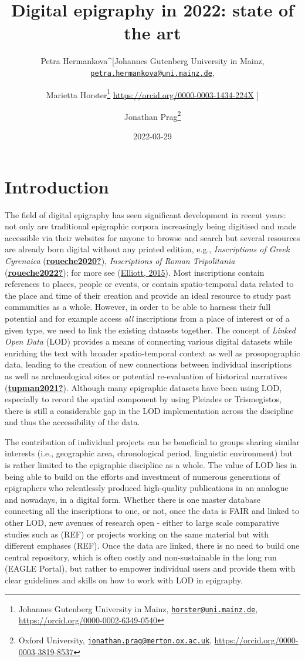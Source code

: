 \documentclass[
]{article}
\title{Digital epigraphy in 2022: state of the art}
\author{Petra Hermankova\^{}{[}Johannes Gutenberg University in Mainz,
\href{mailto:petra.hermankova@uni.mainz.de}{\nolinkurl{petra.hermankova@uni.mainz.de}}, \and Marietta
Horster\footnote{Johannes Gutenberg University in Mainz,
  \href{mailto:horster@uni.mainz.de}{\nolinkurl{horster@uni.mainz.de}},
  \url{https://orcid.org/0000-0002-6349-0540}}
\url{https://orcid.org/0000-0003-1434-224X} {]} \and Jonathan
Prag\footnote{Oxford University,
  \href{mailto:jonathan.prag@merton.ox.ac.uk}{\nolinkurl{jonathan.prag@merton.ox.ac.uk}},
  \url{https://orcid.org/0000-0003-3819-8537}}}
\date{2022-03-29}
\begin{document}
\maketitle

{
\setcounter{tocdepth}{4}
\tableofcontents
}
\hypertarget{introduction}{%
\section{Introduction}\label{introduction}}

The field of digital epigraphy has seen significant development in
recent years: not only are traditional epigraphic corpora increasingly
being digitised and made accessible via their websites for anyone to
browse and search but several resources are already born digital without
any printed edition, e.g., \emph{Inscriptions of Greek Cyrenaica}
(\protect\hyperlink{ref-roueche2020}{\textbf{roueche2020?}}),
\emph{Inscriptions of Roman Tripolitania}
(\protect\hyperlink{ref-roueche2022}{\textbf{roueche2022?}}); for more
see (\protect\hyperlink{ref-bruun_epigraphy_2015}{Elliott, 2015}). Most
inscriptions contain references to places, people or events, or contain
spatio-temporal data related to the place and time of their creation and
provide an ideal resource to study past communities as a whole. However,
in order to be able to harness their full potential and for example
access \emph{all} inscriptions from a place of interest or of a given
type, we need to link the existing datasets together. The concept of
\emph{Linked Open Data} (LOD) provides a means of connecting various
digital datasets while enriching the text with broader spatio-temporal
context as well as prosopographic data, leading to the creation of new
connections between individual inscriptions as well as archaeological
sites or potential re-evaluation of historical narratives
(\protect\hyperlink{ref-tupman2021}{\textbf{tupman2021?}}). Although
many epigraphic datasets have been using LOD, especially to record the
spatial component by using Pleiades or Trismegistos, there is still a
considerable gap in the LOD implementation across the discipline and
thus the accessibility of the data.

The contribution of individual projects can be beneficial to groups
sharing similar interests (i.e., geographic area, chronological period,
linguistic environment) but is rather limited to the epigraphic
discipline as a whole. The value of LOD lies in being able to build on
the efforts and investment of numerous generations of epigraphers who
relentlessly produced high-quality publications in an analogue and
nowadays, in a digital form. Whether there is one master database
connecting all the inscriptions to one, or not, once the data is FAIR
and linked to other LOD, new avenues of research open - either to large
scale comparative studies such as (REF) or projects working on the same
material but with different emphases (REF). Once the data are linked,
there is no need to build one central repository, which is often costly
and non-sustainable in the long run (EAGLE Portal), but rather to
empower individual users and provide them with clear guidelines and
skills on how to work with LOD in epigraphy.
\end{document}
